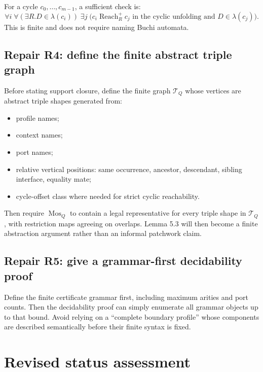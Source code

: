 \documentclass[11pt]{article}
\newcommand{\Reach}{\operatorname{Reach}}
\newcommand{\Mos}{\operatorname{Mos}}
\begin{document}
For a cycle \(c_0,\ldots,c_{m-1}\), a sufficient check is:
\[
\forall i\;\forall(\exists R.D\in\lambda(c_i))\;
\exists j\;\bigl(c_i\Reach_R^+ c_j\text{ in the cyclic unfolding and }D\in\lambda(c_j)\bigr).
\]
This is finite and does not require naming Buchi automata.

\subsection{Repair R4: define the finite abstract triple graph}

Before stating support closure, define the finite graph \(\mathcal T_Q\) whose vertices are abstract triple shapes generated from:
\begin{itemize}[leftmargin=*]
\item profile names;
\item context names;
\item port names;
\item relative vertical positions: same occurrence, ancestor, descendant, sibling interface, equality mate;
\item cycle-offset class where needed for strict cyclic reachability.
\end{itemize}
Then require \(\Mos_Q\) to contain a legal representative for every triple shape in \(\mathcal T_Q\), with restriction maps agreeing on overlaps.  Lemma 5.3 will then become a finite abstraction argument rather than an informal patchwork claim.

\subsection{Repair R5: give a grammar-first decidability proof}

Define the finite certificate grammar first, including maximum arities and port counts.  Then the decidability proof can simply enumerate all grammar objects up to that bound.  Avoid relying on a ``complete boundary profile'' whose components are described semantically before their finite syntax is fixed.

\section{Revised status assessment}
\end{document}
